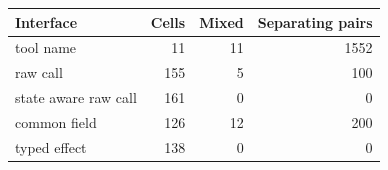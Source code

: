 \begin{tabular}{lrrr}
\toprule
Interface & Cells & Mixed & Separating pairs \\
\midrule
tool name & 11 & 11 & 1552 \\
raw call & 155 & 5 & 100 \\
state aware raw call & 161 & 0 & 0 \\
common field & 126 & 12 & 200 \\
typed effect & 138 & 0 & 0 \\
\bottomrule
\end{tabular}
